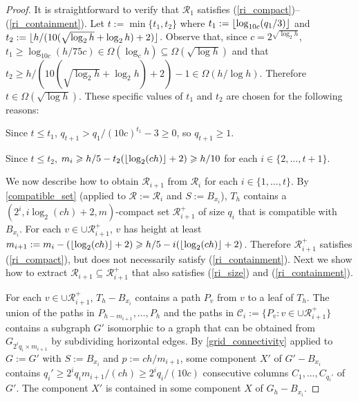 \documentclass{patmorin}
\renewcommand{\le}{\leqslant}
\renewcommand{\ge}{\geqslant}
\begin{document}
\begin{proof}
  It is straightforward to verify that $\mathcal{R}_1$ satisfies (\ref{ri_compact})--(\ref{ri_containment}).
  Let $t:= \min\{t_1,t_2\}$ where $t_1:={\lfloor \log_{10c}(q_1/3) \rfloor}$ and $t_2:={\lfloor h/(10(\sqrt{\log_2 h} + \log_2 h) + 2) \rfloor}$. Observe that, since $c=2^{\sqrt{\log_2 h}}$,  $t_1\ge \log_{10c}(h/75c)\in\Omega(\log_c h)\subseteq \Omega(\sqrt{\log h})$ and that $t_2\ge h/(10(\sqrt{\log_2 h} + \log_2 h) + 2)-1\in\Omega(h/\log h)$.  Therefore $t\in\Omega(\sqrt{\log h})$. These specific values of $t_1$ and $t_2$ are chosen for the following reasons:
  \begin{compactenum}[(i)]
    \item Since $t\le t_1$, $q_{t+1} > q_1/(10c)^{t_1} - 3  \ge 0$, so $q_{t+1}\ge 1$.
    \item Since $t\le t_2$, $m_i\ge h/5-t_2(\floor{\log_2(ch)}+2) \ge h/10$ for each $i\in\{2,\ldots,t+1\}$.
  \end{compactenum}
  We now describe how to obtain $\mathcal{R}_{i+1}$ from $\mathcal{R}_i$ for each $i\in\{1,\ldots,t\}$.  By \cref{compatible_set} (applied to $\mathcal{R}:=\mathcal{R}_i$ and $S:=B_{x_i}$), $T_h$ contains a $(2^i,i\log_2(ch)+2,m)$-compact set $\mathcal{R}_{i+1}^+$ of size $q_i$ that is compatible with $B_{x_i}$. For each $v\in\cup\mathcal{R}_{i+1}^+$, $v$ has height at least $m_{i+1}:=m_i-(\floor{\log_2(ch)}+2)\ge h/5-i(\floor{\log_2(ch)}+2)$.  Therefore $\mathcal{R}_{i+1}^+$ satisfies (\ref{ri_compact}), %
  but does not necessarily satisfy (\ref{ri_containment}).  Next we show how to extract $\mathcal{R}_{i+1}\subseteq\mathcal{R}_{i+1}^+$ that also satisfies (\ref{ri_size}) and (\ref{ri_containment}).

  For each $v\in \cup\mathcal{R}_{i+1}^+$, $T_h-B_{x_i}$ contains a path $P_v$ from $v$ to a leaf of $T_h$.  The union of the paths in $P_{h-m_{i+1}},\ldots,P_{h}$ and the paths in $\mathcal{C}_i:=\{P_v:v\in\cup\mathcal{R}_{i+1}^+\}$ contains a subgraph $G'$ isomorphic to a graph that can be obtained from $G_{2^{i}q_i\times m_{i+1}}$ by subdividing horizontal edges.  By \cref{grid_connectivity} applied to $G:=G'$ with $S:=B_{x_i}$ and $p:=ch/m_{i+1}$, some component $X'$ of $G'-B_{x_i}$ contains  $q_i'\ge 2^{i}q_im_{i+1}/(ch)\ge 2^iq_i/(10c)$ consecutive columns $C_1,\ldots,C_{q_i'}$ of $G'$.  The component $X'$ is contained in some component $X$ of $G_h-B_{x_i}$.


\end{proof}
\end{document}
